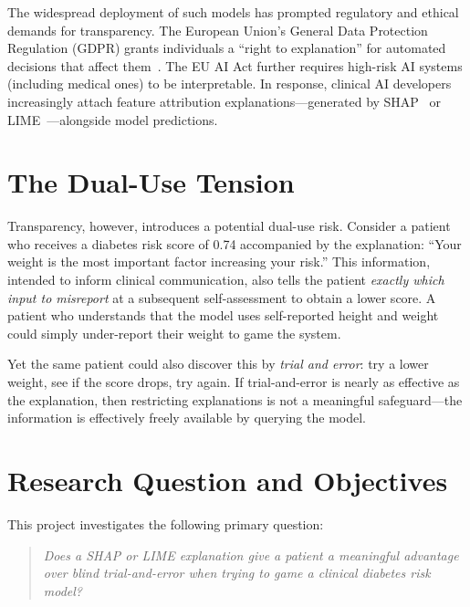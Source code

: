 \documentclass[12pt, a4paper, oneside]{report}
\theoremstyle{definition}
\begin{document}
The widespread deployment of such models has prompted regulatory and
ethical demands for transparency. The European Union's General Data
Protection Regulation (GDPR) grants individuals a ``right to explanation''
for automated decisions that affect them~\citep{goodman2017european}.
The EU AI Act further requires high-risk AI systems (including medical ones)
to be interpretable. In response, clinical AI developers increasingly
attach feature attribution explanations---generated by SHAP~\citep{lundberg2017shap}
or LIME~\citep{ribeiro2016lime}---alongside model predictions.

\section{The Dual-Use Tension}

Transparency, however, introduces a potential dual-use risk. Consider a
patient who receives a diabetes risk score of 0.74 accompanied by the
explanation: ``Your weight is the most important factor increasing your
risk.'' This information, intended to inform clinical communication, also
tells the patient \textit{exactly which input to misreport} at a subsequent
self-assessment to obtain a lower score. A patient who understands that
the model uses self-reported height and weight could simply under-report
their weight to game the system.

Yet the same patient could also discover this by \textit{trial and error}:
try a lower weight, see if the score drops, try again. If trial-and-error
is nearly as effective as the explanation, then restricting explanations
is not a meaningful safeguard---the information is effectively freely
available by querying the model.

\section{Research Question and Objectives}

This project investigates the following primary question:

\begin{quote}
  \textit{Does a SHAP or LIME explanation give a patient a meaningful advantage
  over blind trial-and-error when trying to game a clinical diabetes risk model?}
\end{quote}
\end{document}
